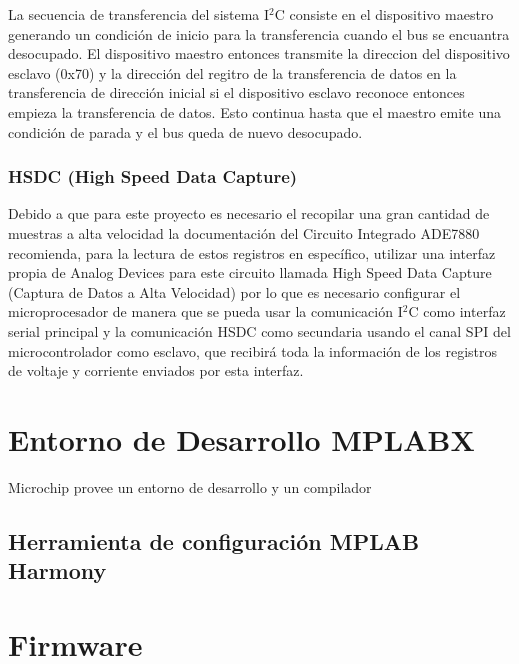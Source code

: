 \documentclass[letterpaper,12pt,oneside]{book}
\begin{document}
			La secuencia de transferencia del sistema I$^2$C consiste en el dispositivo maestro generando un condición de inicio para la transferencia cuando el bus se encuantra desocupado. El dispositivo maestro entonces transmite la direccion del dispositivo esclavo (0x70) y la dirección del regitro de la transferencia de datos en la transferencia de dirección inicial si el dispositivo esclavo reconoce entonces empieza la transferencia de datos. Esto continua hasta que el maestro emite una condición de parada y el bus queda de nuevo desocupado.

			\subsubsection{HSDC (High Speed Data Capture)}
			Debido a que para este proyecto es necesario el recopilar una gran cantidad de muestras a alta velocidad la documentación del Circuito Integrado ADE7880 recomienda, para la lectura de estos registros en específico, utilizar una interfaz propia de Analog Devices para este circuito llamada High Speed Data Capture (Captura de Datos a Alta Velocidad) por lo que es necesario configurar el microprocesador de manera que se pueda usar la comunicación I$^2$C como interfaz serial principal y la comunicación HSDC como secundaria usando el canal SPI del microcontrolador como esclavo, que recibirá toda la información de los registros de voltaje y corriente enviados por esta interfaz.

		\section{Entorno de Desarrollo MPLABX}
		Microchip provee un entorno de desarrollo y un compilador 
			\subsection{Herramienta de configuración MPLAB Harmony}

		\section{Firmware}
\end{document}
